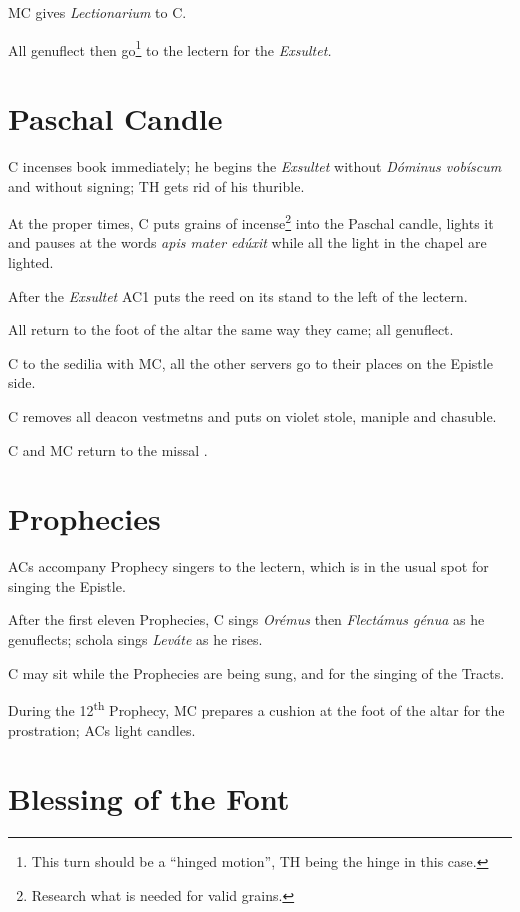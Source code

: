 {\rubric MC gives \textit{Lectionarium} to C.

\rubric All genuflect then go\footnote{This turn should be a ``hinged motion'',
TH being the hinge in this case.} to the lectern for the \textit{Exsultet.}

\section{Paschal Candle}

\rubric C incenses book immediately; he begins the \textit{Exsultet} without
\textit{Dóminus vobíscum} and without signing; TH gets rid of his thurible.

\rubric At the proper times, C puts grains of incense\footnote{Research what is
needed for valid grains.} into the Paschal candle, lights it and pauses at the
words \textit{apis mater edúxit} while all the light in the chapel are lighted.

\rubric After the \textit{Exsultet} AC1 puts the reed on its stand to the left
of the lectern.

\rubric All return to the foot of the altar the same way they came; all
genuflect.

\rubric C to the sedilia with MC, all the other servers go to their places on
the Epistle side.

\rubric C removes all deacon vestmetns and puts on violet stole, maniple and
chasuble.

\rubric C and MC return to the missal \pbr.

\section{Prophecies}

\rubric ACs accompany Prophecy singers to the lectern, which is in the usual
spot for singing the Epistle.

\rubric After the first eleven Prophecies, C sings \textit{Orémus} then
\textit{Flectámus génua} as he genuflects; schola sings \textit{Leváte} as he
rises.  %

\rubric C may sit while the Prophecies are being sung, and for the singing of
the Tracts.

\rubric During the 12\textsuperscript{th} Prophecy, MC prepares a cushion at
the foot of the altar for the prostration; ACs light candles.

\section{Blessing of the Font}

}
